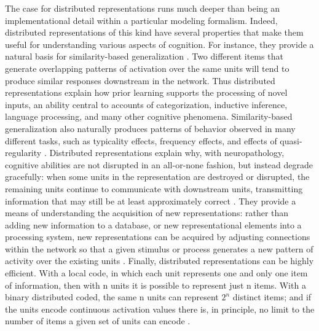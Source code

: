 The case for distributed representations runs much deeper than being an implementational detail within a particular modeling formalism. Indeed, distributed representations of this kind have several properties that make them useful for understanding various aspects of cognition. For instance, they provide a natural basis for similarity-based generalization \cite{hinton_distributed_1984,RumelhartTodd93}. Two different items that generate overlapping patterns of activation over the same units will tend to produce similar responses downstream in the network. Thus distributed representations explain how prior learning supports the processing of novel inputs, an ability central to accounts of categorization, inductive inference, language processing, and many other cognitive phenomena. Similarity-based generalization also naturally produces patterns of behavior observed in many different tasks, such as typicality effects, frequency effects, and effects of quasi-regularity \cite{plaut_understanding_1996,rogers_semantic_2004}. Distributed representations explain why, with neuropathology, cognitive abilities are not disrupted in an all-or-none fashion, but instead degrade gracefully: when some units in the representation are destroyed or disrupted, the remaining units continue to communicate with downstream units, transmitting information that may still be at least approximately correct \cite{Allport85,cooper_shallice_2011}. They provide a means of understanding the acquisition of new representations: rather than adding new information to a database, or new representational elements into a processing system, new representations can be acquired by adjusting connections within the network so that a given stimulus or process generates a new pattern of activity over the existing units \cite{RumelhartTodd93}. Finally, distributed representations can be highly efficient. With a local code, in which each unit represents one and only one item of information, then with n units it is possible to represent just n items. With a binary distributed coded, the same n units can represent $2^n$ distinct items; and if the units encode continuous activation values there is, in principle, no limit to the number of items a given set of units can encode \cite{hinton_distributed_1984}.

